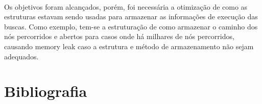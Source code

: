 \documentclass[12pt]{article}
\begin{document}
\paragraph{}
Os objetivos foram alcançados, porém, foi necessária a otimização de como as estruturas estavam sendo usadas para armazenar as informações de execução das buscas. Como exemplo, tem-se a estruturação de como armazenar o caminho dos nós percorridos e abertos para casos onde há milhares de nós percorridos, causando memory leak caso a estrutura e método de armazenamento não sejam adequados.

\newpage
\section{Bibliografia}


\end{document}
